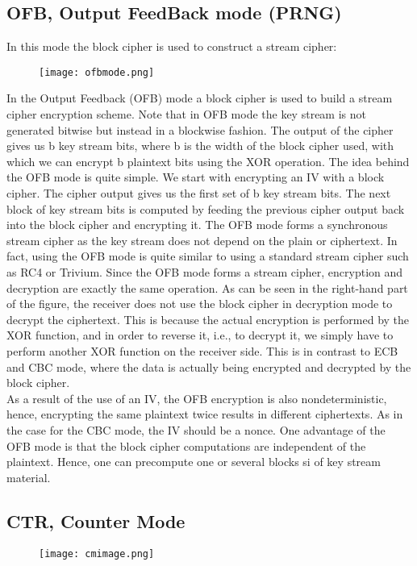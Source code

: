 \documentclass{article}
\begin{document}
\newpage
\subsection{OFB, Output FeedBack mode (PRNG)}
In this mode the block cipher is used to construct a stream cipher:

\begin{figure}[htp]
    \centering
    \texttt{[image: ofbmode.png]}
\end{figure}

In the Output Feedback (OFB) mode a block cipher is used to build a stream cipher
encryption scheme. Note that in OFB mode the key stream is not generated bitwise but instead in a blockwise fashion. The output
of the cipher gives us b key stream bits, where b is the width of the block cipher
used, with which we can encrypt b plaintext bits using the XOR operation.
The idea behind the OFB mode is quite simple. We start with encrypting an IV
with a block cipher. The cipher output gives us the first set of b key stream bits.
The next block of key stream bits is computed by feeding the previous cipher output
back into the block cipher and encrypting it.
The OFB mode forms a synchronous stream cipher as the key stream
does not depend on the plain or ciphertext. In fact, using the OFB mode is quite similar
to using a standard stream cipher such as RC4 or Trivium. Since the OFB mode
forms a stream cipher, encryption and decryption are exactly the same operation.
As can be seen in the right-hand part of the figure, the receiver does not use the block
cipher in decryption mode to decrypt the ciphertext. This is because the actual
encryption is performed by the XOR function, and in order to reverse it, i.e., to decrypt
it, we simply have to perform another XOR function on the receiver side. This
is in contrast to ECB and CBC mode, where the data is actually being encrypted and
decrypted by the block cipher.\\

\vspace{1cm}
As a result of the use of an IV, the OFB encryption is also nondeterministic,
hence, encrypting the same plaintext twice results in different ciphertexts. As in the
case for the CBC mode, the IV should be a nonce. One advantage of the OFB mode
is that the block cipher computations are independent of the plaintext. Hence, one
can precompute one or several blocks si of key stream material.

\subsection{CTR, Counter Mode}
\begin{figure}[htp]
    \centering
    \texttt{[image: cmimage.png]}
\end{figure}
\end{document}
